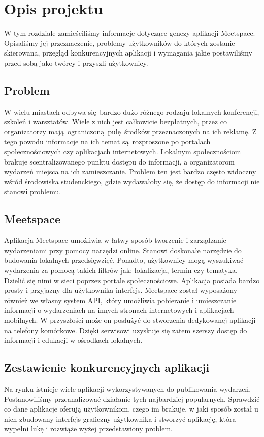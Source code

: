 \section{Opis projektu}
W tym rozdziale zamieściliśmy informacje dotyczące genezy aplikacji Meetspace. Opisaliśmy jej przeznaczenie, problemy użytkowników do których zostanie skierowana, przegląd konkurencyjnych aplikacji i wymagania jakie postawiliśmy przed sobą jako twórcy i przyszli użytkownicy.
\subsection{Problem}
W wielu miastach odbywa się bardzo dużo różnego rodzaju lokalnych konferencji, szkoleń i warsztatów. Wiele z nich jest całkowicie bezpłatnych, przez co organizatorzy mają ograniczoną pulę środków przeznaczonych na ich reklamę. Z tego powodu informacje na ich temat są rozproszone po portalach społecznościowych czy aplikacjach internetowych. Lokalnym społecznościom brakuje scentralizowanego punktu dostępu do informacji, a organizatorom wydarzeń miejsca na ich zamieszczanie. Problem ten jest bardzo często widoczny wśród środowiska studenckiego, gdzie wydawałoby się, że dostęp do informacji nie stanowi problemu.  
\subsection{Meetspace}
Aplikacja Meetspace umożliwia w łatwy sposób tworzenie i zarządzanie wydarzeniami przy pomocy narzędzi online. Stanowi doskonałe narzędzie do budowania lokalnych przedsięwzięć. Ponadto, użytkownicy mogą wyszukiwać wydarzenia za pomocą takich filtrów jak: lokalizacja, termin czy tematyka. Dzielić się nimi w sieci poprzez portale społecznościowe. Aplikacja posiada bardzo prosty i przyjazny dla użytkownika interfejs. Meetspace został wyposażony również we własny system API, który umożliwia pobieranie i umieszczanie informacji o wydarzeniach na innych stronach internetowych i aplikacjach mobilnych. W przyszłości może on posłużyć do stworzenia dedykowanej aplikacji na telefony komórkowe. Dzięki serwisowi uzyskuje się zatem szerszy dostęp do informacji i edukacji w ośrodkach lokalnych.
\subsection{Zestawienie konkurencyjnych aplikacji}
Na rynku istnieje wiele aplikacji wykorzystywanych do publikowania wydarzeń. Postanowiliśmy przeanalizować działanie tych najbardziej popularnych. Sprawdzić co dane aplikacje oferują użytkownikom, czego im brakuje, w jaki sposób został u nich zbudowany interfejs graficzny użytkownika i stworzyć aplikację, która wypełni lukę i rozwiąże wyżej przedstawiony problem.

